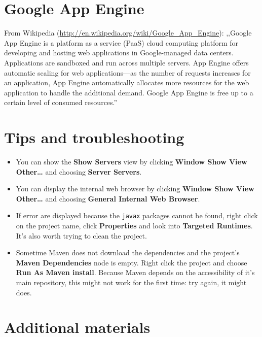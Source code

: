 \documentclass[]{report}
\begin{document}
\section{Google App Engine}

From Wikipedia (\url{http://en.wikipedia.org/wiki/Google_App_Engine}):
,,Google App Engine is a platform as a service (PaaS) cloud computing
platform for developing and hosting web applications in Google-managed
data centers. Applications are sandboxed and run across multiple
servers. App Engine offers automatic scaling for web applications---as
the number of requests increases for an application, App Engine
automatically allocates more resources for the web application to handle
the additional demand. Google App Engine is free up to a certain level
of consumed resources.''

\section{Tips and troubleshooting}

\begin{itemize}
\itemsep1pt\parskip0pt
\item
  You can show the \textbf{Show Servers} view by clicking \textbf{Window
  \textbar{} Show View \textbar{} Other\ldots{}} and choosing
  \textbf{Server \textbar{} Servers}.
\item
  You can display the internal web browser by clicking \textbf{Window
  \textbar{} Show View \textbar{} Other\ldots{}} and choosing
  \textbf{General \textbar{} Internal Web Browser}.
\item
  If error are displayed because the \texttt{javax} packages cannot be
  found, right click on the project name, click \textbf{Properties} and
  look into \textbf{Targeted Runtimes}. It's also worth trying to clean
  the project.
\item
  Sometime Maven does not download the dependencies and the project's
  \textbf{Maven Dependencies} node is empty. Right click the project and
  choose \textbf{Run As \textbar{} Maven install}. Because Maven depends
  on the accessibility of it's main repository, this might not work for
  the first time: try again, it might does.
\end{itemize}

\section{Additional materials}
\end{document}
